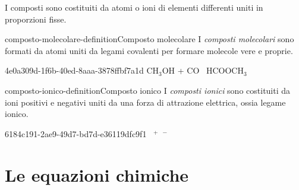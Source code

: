 \documentclass[preview]{standalone}
\begin{document}
\begin{plainhtml}
    I composti sono costituiti da atomi o ioni di elementi differenti uniti in proporzioni fisse.
\end{plainhtml}

\begin{snippetdefinition}{composto-molecolare-definition}{Composto molecolare}
    I \textit{composti molecolari} sono formati da atomi uniti da legami covalenti per
    formare molecole vere e proprie.
\end{snippetdefinition}


\begin{snippet}{4e0a309d-1f6b-40ed-8aaa-3878ffbf7a1d}
    CH$_3$OH + CO \textrightarrow\ HCOOCH$_3$
\end{snippet}

\begin{snippetdefinition}{composto-ionico-definition}{Composto ionico}
    I \textit{composti ionici} sono costituiti da ioni positivi e negativi
    uniti da una forza di attrazione elettrica, ossia legame ionico.
\end{snippetdefinition}


\begin{snippet}{6184c191-2ae9-49d7-bd7d-e36119dfc9f1}
     \textrightarrow\ 
    $^+$\
    \chemleft[\chemfig{\Charge{90=\|,0=\|,-90=\|,180=\|}{Cl}}\chemright]$^-$
\end{snippet}

\section{Le equazioni chimiche}
\end{document}
